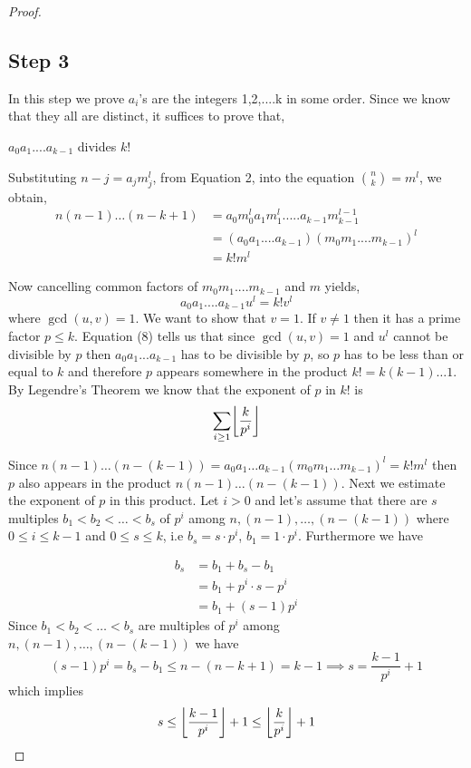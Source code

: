 \documentclass[a4paper]{article}
\DeclarePairedDelimiter\floor{\lfloor}{\rfloor}
\begin{document}
\begin{proof}
\subsection{Step 3}
In this step we prove $a_i$'s are the integers 1,2,....k in some order.
Since we know that they all are distinct, it suffices to prove that,

\begin{center}
 $a_0 a_1....a_{k-1}$ divides $k!$
\end{center}

Substituting  $n-j = a_j m_j^{l}$, from Equation 2, into the equation ${n \choose k} = m^l$, we obtain, 
\begin{align*}
n(n-1)\dots (n-k+1) & = a_0 m_0^{l} a_1 m_1^{l} ..... a_{k-1} m_{k-1}^{l-1}\\
&=( a_0 a_1 ....a_{k-1}) (m_0 m_1....m_{k-1})^l \\ 
&= k!m^l 
\end{align*} 

Now cancelling common factors of $m_0 m_1....m_{k-1}$ and $m$ yields, 
\begin{equation}
a_0 a_1 ....a_{k-1} u^l = k!v^l 
\end{equation} 
where $\gcd (u,v)=1$. We want to show that $v=1$. If $v \neq 1$ then it has a prime factor $p\leq k$. Equation (8) tells us that since $\gcd(u,v)=1$ and $u^l$ cannot be divisible by $p$ then  $a_0 a_1 ... a_{k-1}$ has to be divisible by $p$, so $p$ has to be less than or equal to $k$ and therefore $p$ appears somewhere in the product $k!=k(k-1) \dots 1$.\\

 
By Legendre's Theorem we know that the exponent of $p$ in  $k!$ is $$\sum_{i \geq 1} \floor*{\frac{k}{p^i}} $$ 

Since $n(n-1) \dots (n-(k-1))= a_{0}a_{1}\dots a_{k-1}{(m_{0}m_{1}\dots m_{k-1})}^l=k!m^l$ then $p$ also appears in the product $n(n-1) \dots (n-(k-1))$. Next we estimate the exponent of $p$ in this product.
Let $i>0$ and let's assume that there are $s$ multiples $b_{1}<b_{2}<\dots <b_{s}$ of $p^i$  among $n,(n-1),\dots ,(n-(k-1))$ where $ 0\leq i \leq k-1$ and $0\leq s \leq k$, i.e $b_{s}=s\cdot p^i$, $b_{1}=1\cdot p^i$. Furthermore we have

\begin{align*}
b_s &= b_1 + b_s - b_1\\
&= b_{1}+ p^i\cdot s-p^i\\
&=b_{1}+(s-1)p^i
\end{align*}
Since  $b_{1}<b_{2}<\dots <b_{s}$ are multiples of $p^i$ among  $n,(n-1),\dots ,(n-(k-1))$ we have 
$$(s-1)p^i = b_s - b_1 \leq n-(n-k+1) = k-1 \implies s= \frac{k-1}{p^i}+1$$
which implies
\begin{equation}
s \leq \floor*{\frac{k-1}{p^i}} + 1 \leq \floor*{\frac{k}{p^i}} + 1
\end{equation}


\end{proof}
\end{document}
